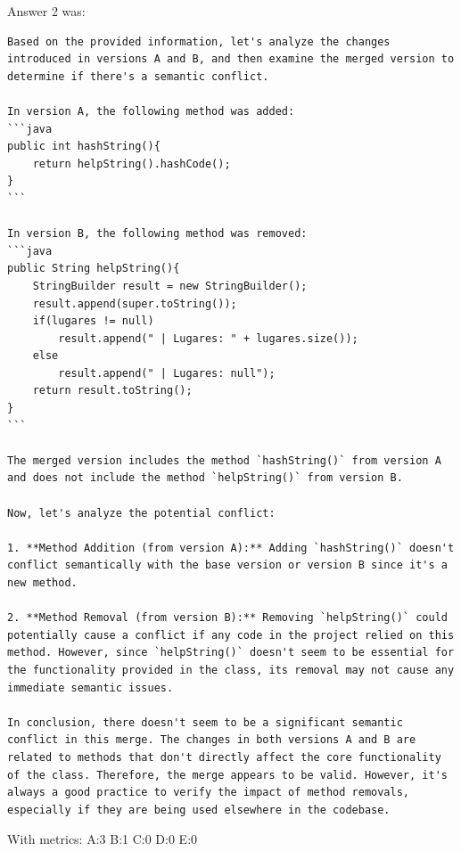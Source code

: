 Answer 2 was:
\begin{lstlisting}
Based on the provided information, let's analyze the changes introduced in versions A and B, and then examine the merged version to determine if there's a semantic conflict.

In version A, the following method was added:
```java
public int hashString(){
    return helpString().hashCode();
}
```

In version B, the following method was removed:
```java
public String helpString(){
    StringBuilder result = new StringBuilder();
    result.append(super.toString());
    if(lugares != null)
        result.append(" | Lugares: " + lugares.size());
    else
        result.append(" | Lugares: null");
    return result.toString();
}
```

The merged version includes the method `hashString()` from version A and does not include the method `helpString()` from version B.

Now, let's analyze the potential conflict:

1. **Method Addition (from version A):** Adding `hashString()` doesn't conflict semantically with the base version or version B since it's a new method.

2. **Method Removal (from version B):** Removing `helpString()` could potentially cause a conflict if any code in the project relied on this method. However, since `helpString()` doesn't seem to be essential for the functionality provided in the class, its removal may not cause any immediate semantic issues.

In conclusion, there doesn't seem to be a significant semantic conflict in this merge. The changes in both versions A and B are related to methods that don't directly affect the core functionality of the class. Therefore, the merge appears to be valid. However, it's always a good practice to verify the impact of method removals, especially if they are being used elsewhere in the codebase.
\end{lstlisting}

With metrics:
A:3
B:1
C:0
D:0
E:0

